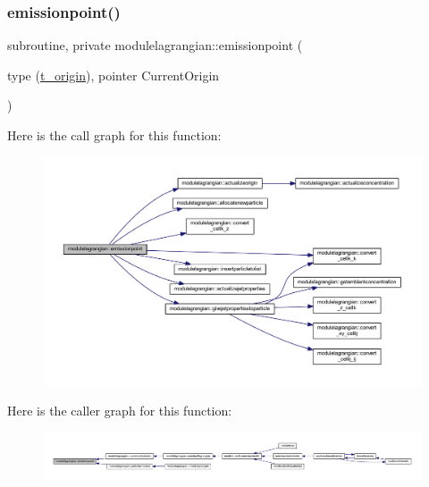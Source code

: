 \subsubsection{\texorpdfstring{emissionpoint()}{emissionpoint()}}
{\footnotesize\ttfamily subroutine, private modulelagrangian\+::emissionpoint (\begin{DoxyParamCaption}\item[{type (\mbox{\hyperlink{structmodulelagrangian_1_1t__origin}{t\+\_\+origin}}), pointer}]{Current\+Origin }\end{DoxyParamCaption})\hspace{0.3cm}{\ttfamily [private]}}

Here is the call graph for this function\+:\nopagebreak
\begin{figure}[H]
\begin{center}
\leavevmode
\includegraphics[width=350pt]{namespacemodulelagrangian_a2c2297af310e54bf92d0a22b49d375ca_cgraph}
\end{center}
\end{figure}
Here is the caller graph for this function\+:\nopagebreak
\begin{figure}[H]
\begin{center}
\leavevmode
\includegraphics[width=350pt]{namespacemodulelagrangian_a2c2297af310e54bf92d0a22b49d375ca_icgraph}
\end{center}
\end{figure}
\mbox{\label{namespacemodulelagrangian_a841c52a7705b666c34f7c0874d5c88d6}} 
